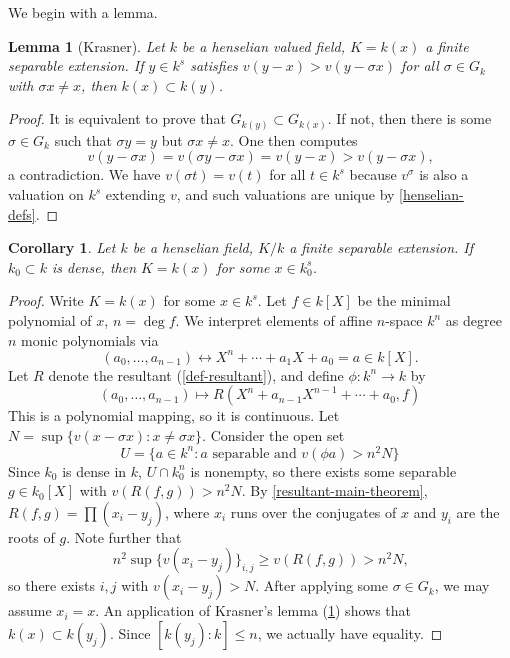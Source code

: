 \documentclass{article}
\newtheorem{corollary}[definition]{Corollary}
\newtheorem{lemma}[definition]{Lemma}
\numberwithin{definition}{subsection}
\begin{document}
We begin with a lemma.
\begin{lemma}[Krasner]\label{lemma-krasner}
Let $k$ be a henselian valued field, $K=k(x)$ a finite separable extension. If 
$y\in k^s$ satisfies $v(y-x) > v(y-\sigma x)$ for all $\sigma\in G_k$ with 
$\sigma x\ne x$, then $k(x)\subset k(y)$. 
\end{lemma}
\begin{proof}
It is equivalent to prove that $G_{k(y)}\subset G_{k(x)}$. If not, then there 
is some $\sigma\in G_k$ such that $\sigma y = y$ but $\sigma x\ne x$. One then 
computes 
\[
  v(y-\sigma x) = v(\sigma y - \sigma x) = v(y-x) > v(y-\sigma x)\text{,}
\]
a contradiction. We have $v(\sigma t) = v(t)$ for all $t\in k^s$ because 
$v^\sigma$ is also a valuation on $k^s$ extending $v$, and such valuations are 
unique by \ref{henselian-defs}. 
\end{proof}

\begin{corollary}\label{henselian-ext-induced-by-dense-subfield}
Let $k$ be a henselian field, $K/k$ a finite separable extension. If 
$k_0\subset k$ is dense, then $K = k(x)$ for some $x\in k_0^s$. 
\end{corollary}
\begin{proof}
Write $K=k(x)$ for some $x\in k^s$. Let $f\in k[X]$ be the minimal polynomial 
of $x$, $n=\deg f$. We interpret elements of affine $n$-space $k^n$ as 
degree $n$ monic polynomials via 
\[
  (a_0,\dotsc,a_{n-1}) \leftrightarrow X^n + \cdots + a_1 X + a_0 = a\in k[X]\text{.}
\]
Let $R$ denote the resultant (\ref{def-resultant}), and define $\phi:k^n\to k$ 
by 
\[
  (a_0,\dotsc,a_{n-1}) \mapsto R(X^n + a_{n-1} X^{n-1} + \cdots + a_0,f)
\]
This is a polynomial mapping, so it is continuous. Let 
$N = \sup\{v(x-\sigma x) : x\ne \sigma x\}$. Consider the open set 
\[
  U = \{a\in k^n : \text{$a$ separable and $v(\phi a)>n^2 N$}\}
\]
Since $k_0$ is dense in $k$, $U\cap k_0^n$ is nonempty, so there exists some 
separable $g\in k_0[X]$ with $v(R(f,g))>n^2 N$. By 
\ref{resultant-main-theorem}, $R(f,g) = \prod (x_i - y_j)$, where $x_i$ runs 
over the conjugates of $x$ and $y_i$ are the roots of $g$. Note further that 
\[
  n^2 \sup \{v(x_i - y_j)\}_{i,j} \geqslant v(R(f,g)) > n^2 N\text{,}
\]
so there exists $i,j$ with $v(x_i - y_j)>N$. After applying some 
$\sigma\in G_k$, we may assume $x_i = x$. An application of Krasner's lemma 
(\ref{lemma-krasner}) shows that $k(x)\subset k(y_j)$. Since 
$[k(y_j):k]\leqslant n$, we actually have equality. 
\end{proof}
\end{document}
